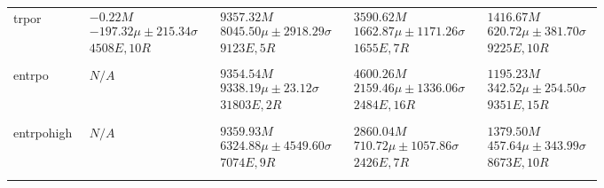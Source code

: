 \begin{tabular}{|l|p{6cm}|p{6cm}|p{6cm}|p{6cm}|}
trpor & $\begin{array}{c} -0.22M \\ -197.32\mu \pm 215.34\sigma \\ 4508E, 10R \end{array}$ & $\begin{array}{c} 9357.32M \\ 8045.50\mu \pm 2918.29\sigma \\ 9123E, 5R \end{array}$ & $\begin{array}{c} 3590.62M \\ 1662.87\mu \pm 1171.26\sigma \\ 1655E, 7R \end{array}$ & $\begin{array}{c} 1416.67M \\ 620.72\mu \pm 381.70\sigma \\ 9225E, 10R \end{array}$ \\ \\ \hline
entrpo & $\begin{array}{c} N/A \end{array}$ & $\begin{array}{c} 9354.54M \\ 9338.19\mu \pm 23.12\sigma \\ 31803E, 2R \end{array}$ & $\begin{array}{c} 4600.26M \\ 2159.46\mu \pm 1336.06\sigma \\ 2484E, 16R \end{array}$ & $\begin{array}{c} 1195.23M \\ 342.52\mu \pm 254.50\sigma \\ 9351E, 15R \end{array}$ \\ \\ \hline
entrpohigh & $\begin{array}{c} N/A \end{array}$ & $\begin{array}{c} 9359.93M \\ 6324.88\mu \pm 4549.60\sigma \\ 7074E, 9R \end{array}$ & $\begin{array}{c} 2860.04M \\ 710.72\mu \pm 1057.86\sigma \\ 2426E, 7R \end{array}$ & $\begin{array}{c} 1379.50M \\ 457.64\mu \pm 343.99\sigma \\ 8673E, 10R \end{array}$ \\ \\ \hline

\end{tabular}
